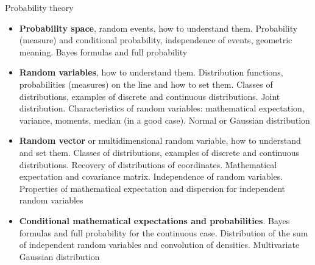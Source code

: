 \documentclass[fullscreen=true, bookmarks=true, hyperref={pdfencoding=unicode}]{beamer}
\begin{document}
\begin{frame}
  Probability theory
  {\scriptsize
  \begin{itemize}
    \item \textbf{Probability space}, random events, how to understand them. 
    Probability (measure) and conditional probability, independence of events, geometric meaning. 
    Bayes formulas and full probability
    \item \textbf{Random variables}, how to understand them. Distribution functions, probabilities (measures) 
    on the line and how to set them. Classes of distributions, examples of discrete and 
    continuous distributions. Joint distribution. Characteristics of random variables: 
    mathematical expectation, variance, moments, median (in a good case). 
    Normal or Gaussian distribution
    \item \textbf{Random vector} or multidimensional random variable, how to understand and set them. 
    Classes of distributions, examples of discrete and continuous distributions. 
    Recovery of distributions of coordinates. Mathematical expectation and covariance matrix. 
    Independence of random variables. Properties of mathematical expectation 
    and dispersion for independent random variables
    \item \textbf{Conditional mathematical expectations and probabilities}. Bayes formulas and 
    full probability for the continuous case. 
    Distribution of the sum of independent random variables and convolution of densities. 
    Multivariate Gaussian distribution
  \end{itemize}
  }

\end{frame}
\end{document}
